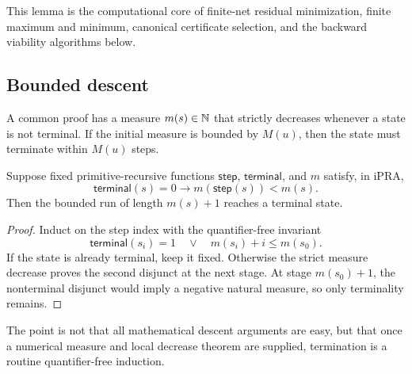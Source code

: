 This lemma is the computational core of finite-net residual minimization,
finite maximum and minimum, canonical certificate selection, and the backward
viability algorithms below.

\subsection{Bounded descent}

A common proof has a measure \(m(s)\in\mathbb N\) that strictly decreases whenever a
state is not terminal.  If the initial measure is bounded by \(M(u)\), then the
state must terminate within \(M(u)\) steps.

\begin{lemma}
\label{lem:descent}
Suppose fixed primitive-recursive functions \(\mathsf{step}\),
\(\mathsf{terminal}\), and \(m\) satisfy, in iPRA,
\[
 \mathsf{terminal}(s)=0\to m(\mathsf{step}(s))<m(s).
\]
Then the bounded run of length \(m(s)+1\) reaches a terminal state.
\end{lemma}

\begin{proof}
Induct on the step index with the quantifier-free invariant
\[
 \mathsf{terminal}(s_i)=1
 \quad\vee\quad m(s_i)+i\le m(s_0).
\]
If the state is already terminal, keep it fixed.  Otherwise the strict measure
decrease proves the second disjunct at the next stage.  At stage
\(m(s_0)+1\), the nonterminal disjunct would imply a negative natural measure,
so only terminality remains.
\end{proof}

The point is not that all mathematical descent arguments are easy, but that
once a numerical measure and local decrease theorem are supplied, termination
is a routine quantifier-free induction.
